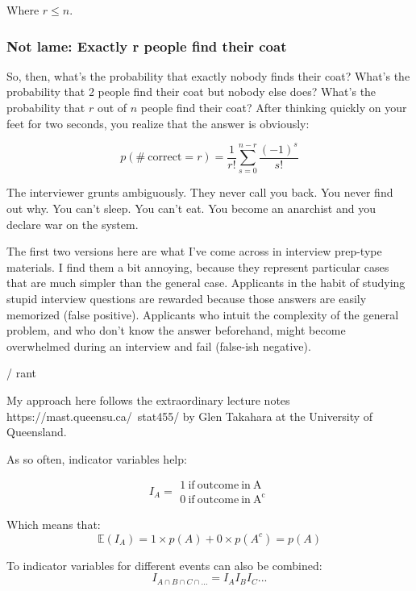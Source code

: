 Where $r\leq n$.

\subsubsection{Not lame: Exactly r people find their coat}
So, then, what's the probability that exactly nobody finds their coat? What's the probability that 2 people find their coat but nobody else does? What's the probability that $r$ out of $n$ people find their coat? After thinking quickly on your feet for two seconds, you realize that the answer is obviously:

\begin{equation}
p(\mathrm{\#\ correct} = r) = \frac{1}{r!}\sum_{s=0}^{n-r} \frac{(-1)^s}{s!}
\end{equation}

The interviewer grunts ambiguously. They never call you back. You never find out why. You can't sleep. You can't eat. You become an anarchist and you declare war on the system.

The first two versions here are what I've come across in interview prep-type materials. I find them a bit annoying, because they represent particular cases that are much simpler than the general case. Applicants in the habit of studying stupid interview questions are rewarded because those answers are easily memorized (false positive). Applicants who intuit the complexity of the general problem, and who don't know the answer beforehand, might become overwhelmed during an interview and fail (false-ish negative).

/ rant

My approach here follows the extraordinary lecture notes https://mast.queensu.ca/~stat455/ by Glen Takahara at the University of Queensland.

As so often, indicator variables help:

\begin{equation}
I_A = \begin{array}{l} 1 \mathrm{\ if\ outcome\ in\ A}\\0 \mathrm{\ if\ outcome\ in\ A^c} \end{array}
\end{equation}

Which means that:
\begin{equation}
\mathbb{E}(I_A) = 1\times p(A) + 0\times p(A^c)= p(A)
\end{equation}

To indicator variables for different events can also be combined:
\begin{equation}
I_{A\cap B\cap C\cap ...} = I_A I_B I_C ...
\end{equation}

